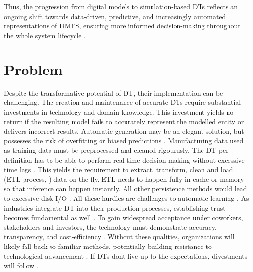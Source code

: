 Thus, the progression from digital models to simulation-based DTs reflects an ongoing shift towards data-driven, predictive, and increasingly automated representations of DMFS, ensuring more informed decision-making throughout the whole system lifecycle \parencite{boschert2016digital,lim2020state}.

\section{Problem}
Despite the transformative potential of DT, their implementation can be challenging. The creation and maintenance of accurate DTs require substantial investments in technology and domain knowledge. This investment yields no return if the resulting model fails to accurately represent the modelled entity or delivers incorrect results. Automatic generation may be an elegant solution, but possesses the risk of overfitting or biased predictions \parencite{gemanbias}. Manufacturing data used as training data must be preprocessed and cleaned rigourusly. The DT per definition has to be able to perform real-time decision making without excessive time lags \parencite{buildings11040151}. This yields the requirement to extract, transform, clean and load (ETL process, \cite{vassiliadis2002conceptual}) data on the fly. ETL needs to happen fully in cache or memory so that inference can happen instantly. All other persistence methods would lead to excessive disk I/O \parencite{mandala2024etl}.
All these hurdles are challenges to automatic learning \parencite{ribeiro2016should,zhao2024data}. As industries integrate DT into their production processes, establishing trust becomes fundamental as well \parencite{trauer2022digital,arrieta2020explainable}. To gain widespread acceptance under coworkers, stakeholders and investors, the technology must demonstrate accuracy, transparency, and cost-efficiency \parencite{Wright2020amse,Shao2023mfglet}. Without these qualities, organizations will likely fall back to familiar methods, potentially building resistance to technological advancement \parencite{lapointe2005multilevel}. If DTs dont live up to the expectations, divestments will follow \parencite{cognizant2020divestitures}.

